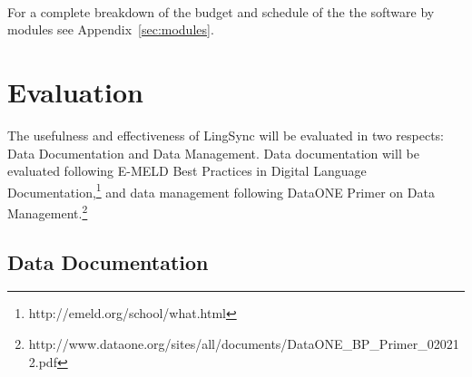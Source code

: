 \documentclass[12pt]{article}
\begin{document}
~\\
For a complete breakdown of the budget and schedule of the the software by modules see Appendix~\ref{sec:modules}.





\normalsize




\section {Evaluation}



The usefulness and effectiveness of LingSync will be evaluated in two respects: Data Documentation and Data Management. Data documentation will be evaluated following E-MELD Best Practices in Digital Language Documentation,\footnote{http://emeld.org/school/what.html} and data management following DataONE Primer on Data Management.\footnote{http://www.dataone.org/sites/all/documents/DataONE\_BP\_Primer\_020212.pdf}



\subsection {Data Documentation }
\end{document}
